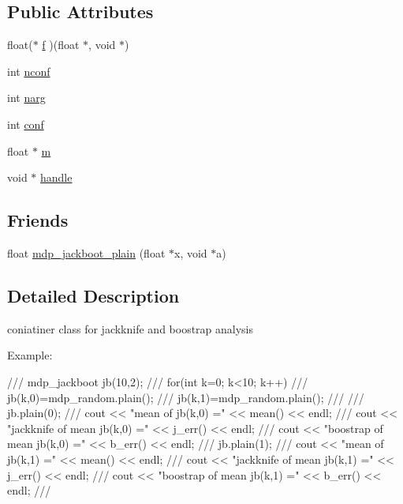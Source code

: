 \subsection*{Public Attributes}
\begin{DoxyCompactItemize}
\item 
float($\ast$ \hyperlink{classmdp__jackboot_a215b212f95a20bfbbe132e53dca708cd}{f} )(float $\ast$, void $\ast$)
\item 
int \hyperlink{classmdp__jackboot_a584457952e56b7deb3bea2f7b1f801d2}{nconf}
\item 
int \hyperlink{classmdp__jackboot_a455155a1460bacf19f95a3c1a3732714}{narg}
\item 
int \hyperlink{classmdp__jackboot_ae84ce36555fb3089989232ca91d80e15}{conf}
\item 
float $\ast$ \hyperlink{classmdp__jackboot_a8f586ad6739906a0d3c8c1aba3a9886b}{m}
\item 
void $\ast$ \hyperlink{classmdp__jackboot_acb66568807fa4180f1c55c05d87e8cca}{handle}
\end{DoxyCompactItemize}
\subsection*{Friends}
\begin{DoxyCompactItemize}
\item 
float \hyperlink{classmdp__jackboot_ad5b6e252253804e3e371008fbad7b43a}{mdp\+\_\+jackboot\+\_\+plain} (float $\ast$x, void $\ast$a)
\end{DoxyCompactItemize}


\subsection{Detailed Description}
coniatiner class for jackknife and boostrap analysis 

Example\+: \begin{DoxyVerb}///    mdp_jackboot jb(10,2);
///    for(int k=0; k<10; k++) {       
///       jb(k,0)=mdp_random.plain();
///       jb(k,1)=mdp_random.plain();
///    }
///    jb.plain(0);
///    cout << "mean of jb(k,0) =" << mean() << endl;
///    cout << "jackknife of mean jb(k,0) =" << j_err() << endl;
///    cout << "boostrap of mean jb(k,0) =" << b_err() << endl;
///    jb.plain(1);
///    cout << "mean of jb(k,1) =" << mean() << endl;
///    cout << "jackknife of mean jb(k,1) =" << j_err() << endl;
///    cout << "boostrap of mean jb(k,1) =" << b_err() << endl;
/// \end{DoxyVerb}
 

